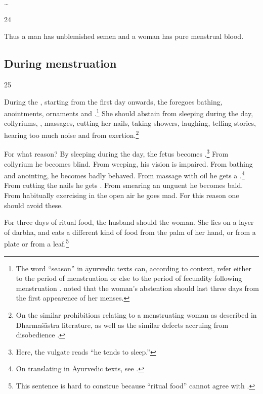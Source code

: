 \begin{translation}
\item[\ldots] 
 
\item[24]

Thus a man has unblemished semen and a woman has pure menstrual blood. 
 
 \subsection{During menstruation}
 
 \item[25]
 
During the , starting from the first day onwards, the
 foregoes bathing, anointments,
ornaments and .\footnote{The word 
    “season” in āyurvedic texts can, according to context, refer either to
    the period of menstruation or else to the period of fecundity
    following menstruation \citep[15\,ff., note 27, \emph{et
    passim}]{das-2003}.  noted that the woman's
    abstention should last three days from the first appearence of her
    menses.} She should abstain from sleeping during the day, collyriums,
    , massages, cutting her nails, taking
    showers, laughing, telling stories, hearing too much noise and from
    exertion.\footnote{On the similar prohibitions relating to a
        menstruating woman as described in Dharmaśāstra literature, as well as
        the similar defects accruing from disobedience         
        \citep[see][284--287]{lesl-1989}.}
        
For what reason?  By sleeping during the day, the fetus becomes
.\footnote{Here, the vulgate reads  “he
    tends to sleep.”} From collyrium he becomes blind.  From weeping, his
    vision is impaired. From bathing and anointing, he becomes badly
    behaved. From massage with oil he gets a .\footnote{On translating  in Āyurvedic texts, see
        \cite[96\,ff]{emme-1984}.} From cutting the nails he gets
        .  From smearing an unguent he becomes bald.
        From habitually exercising in the open air he goes mad. For this
        reason one should avoid these.
    
For three days of ritual food, the husband should  the
woman.  She lies on a layer of \gls{darbha}, and eats a different kind of food
from the palm of her hand, or from a plate or from a leaf.\footnote{This
    sentence is hard to construe because  “ritual food” cannot 
    agree
    with .}


\end{translation}
